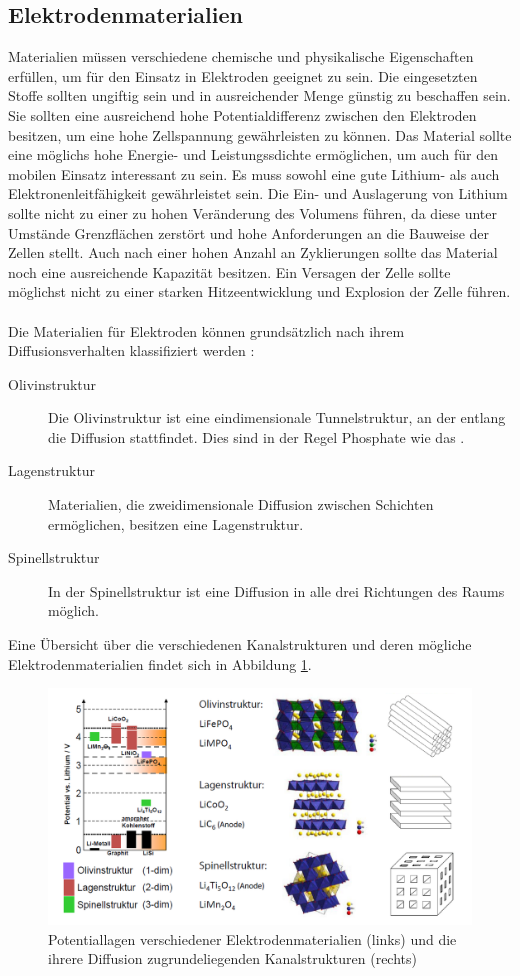 \documentclass[a4paper, 11pt, headsepline,footsepline,twoside,abstract]{scrbook}
\begin{document}
\subsection{Elektrodenmaterialien}
Materialien müssen verschiedene chemische und physikalische Eigenschaften erfüllen, um für den Einsatz in Elektroden geeignet zu sein. Die eingesetzten Stoffe sollten ungiftig sein und in ausreichender Menge günstig zu beschaffen sein. Sie sollten eine ausreichend hohe Potentialdifferenz zwischen den Elektroden besitzen, um eine hohe Zellspannung gewährleisten zu können. Das Material sollte eine möglichs hohe Energie- und Leistungssdichte ermöglichen, um auch für den mobilen Einsatz interessant zu sein. Es muss sowohl eine gute Lithium- als auch Elektronenleitfähigkeit gewährleistet sein. Die Ein- und Auslagerung von Lithium sollte nicht zu einer zu hohen Veränderung des Volumens führen, da diese unter Umstände Grenzflächen zerstört und hohe Anforderungen an die Bauweise der Zellen stellt. Auch nach einer hohen Anzahl an Zyklierungen sollte das Material noch eine ausreichende Kapazität besitzen. Ein Versagen der Zelle sollte möglichst nicht zu einer starken Hitzeentwicklung und Explosion der Zelle führen.
\\\\
Die Materialien für Elektroden können grundsätzlich nach ihrem Diffusionsverhalten klassifiziert werden \cite{graf2013kathodenmaterialien}:
\begin{description}
\item[Olivinstruktur] Die Olivinstruktur ist eine eindimensionale Tunnelstruktur, an der entlang die Diffusion stattfindet. Dies sind in der Regel Phosphate wie das .
\item[Lagenstruktur] Materialien, die zweidimensionale Diffusion zwischen Schichten ermöglichen, besitzen eine Lagenstruktur.
\item[Spinellstruktur] In der Spinellstruktur ist eine Diffusion in alle drei Richtungen des Raums möglich.
\end{description}
Eine Übersicht über die verschiedenen Kanalstrukturen und deren mögliche Elektrodenmaterialien findet sich in Abbildung \ref{strukturen_elektroden}.
\begin{figure}
	\centering
	\includegraphics[width=1.0\columnwidth]{images/strukturen_elektroden.png}
	\caption{Potentiallagen verschiedener Elektrodenmaterialien (links) und die ihrere Diffusion zugrundeliegenden Kanalstrukturen (rechts) \cite{bub_skript}}
	\label{strukturen_elektroden}
\end{figure}
\end{document}

